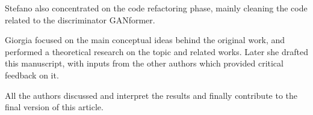 \documentclass{article}
\begin{document}
Stefano also concentrated on the code refactoring phase, mainly cleaning the code related to the 
discriminator GANformer.

Giorgia focused on the main conceptual ideas behind the original work, and performed a theoretical 
research on the topic and related works. 
Later she drafted this manuscript, with inputs from the other authors which provided critical 
feedback on it. 

All the authors discussed and interpret the results and finally contribute to the final version of this 
article.


\clearpage



\clearpage
\appendix
%	
%	
%	
\end{document}
